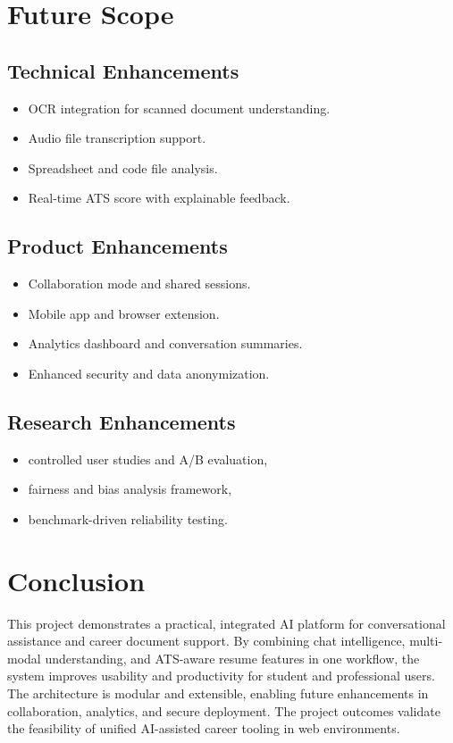 \documentclass[12pt,a4paper]{report}
\begin{document}
\chapter{Future Scope}
\section{Technical Enhancements}
\begin{itemize}
  \item OCR integration for scanned document understanding.
  \item Audio file transcription support.
  \item Spreadsheet and code file analysis.
  \item Real-time ATS score with explainable feedback.
\end{itemize}

\section{Product Enhancements}
\begin{itemize}
  \item Collaboration mode and shared sessions.
  \item Mobile app and browser extension.
  \item Analytics dashboard and conversation summaries.
  \item Enhanced security and data anonymization.
\end{itemize}

\section{Research Enhancements}
\begin{itemize}
  \item controlled user studies and A/B evaluation,
  \item fairness and bias analysis framework,
  \item benchmark-driven reliability testing.
\end{itemize}

\chapter{Conclusion}
This project demonstrates a practical, integrated AI platform for conversational assistance and career document support. By combining chat intelligence, multi-modal understanding, and ATS-aware resume features in one workflow, the system improves usability and productivity for student and professional users. The architecture is modular and extensible, enabling future enhancements in collaboration, analytics, and secure deployment. The project outcomes validate the feasibility of unified AI-assisted career tooling in web environments.
\end{document}
